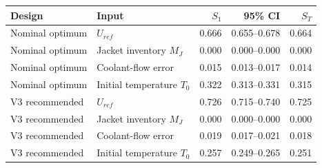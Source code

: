 \begin{tabular}{llrrr}
\toprule
Design & Input & $S_1$ & 95\% CI & $S_T$ \\
\midrule
Nominal optimum & $U_{ref}$ & 0.666 & 0.655--0.678 & 0.664 \\
Nominal optimum & Jacket inventory $M_J$ & 0.000 & 0.000--0.000 & 0.000 \\
Nominal optimum & Coolant-flow error & 0.015 & 0.013--0.017 & 0.014 \\
Nominal optimum & Initial temperature $T_0$ & 0.322 & 0.313--0.331 & 0.315 \\
V3 recommended & $U_{ref}$ & 0.726 & 0.715--0.740 & 0.725 \\
V3 recommended & Jacket inventory $M_J$ & 0.000 & 0.000--0.000 & 0.000 \\
V3 recommended & Coolant-flow error & 0.019 & 0.017--0.021 & 0.018 \\
V3 recommended & Initial temperature $T_0$ & 0.257 & 0.249--0.265 & 0.251 \\
\bottomrule
\end{tabular}
